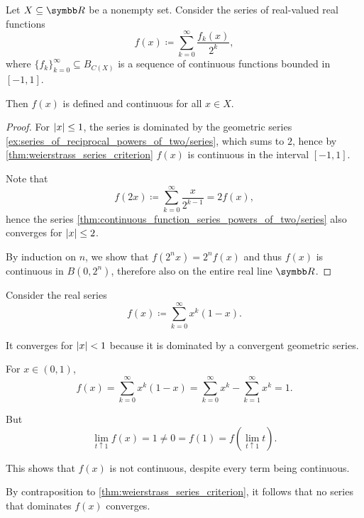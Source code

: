 \begin{corollary}\label{thm:continuous_function_series_powers_of_two}
  Let \( X \subseteq \R \) be a nonempty set. Consider the series of real-valued real functions
  \begin{equation}\label{thm:continuous_function_series_powers_of_two/series}
    f(x) \coloneqq \sum_{k=0}^\infty \frac {f_k(x)} {2^k},
  \end{equation}
  where \( \{ f_k \}_{k=0}^\infty \subseteq B_{C(X)} \) is a sequence of continuous functions bounded in \( [-1, 1] \).

  Then \( f(x) \) is defined and continuous for all \( x \in X \).
\end{corollary}
\begin{proof}
  For \( \left\vert x \right\vert \leq 1 \), the series is dominated by the geometric series \cref{ex:series_of_reciprocal_powers_of_two/series}, which sums to \( 2 \), hence by \cref{thm:weierstrass_series_criterion} \( f(x) \) is continuous in the interval \( [-1, 1] \).

  Note that
  \begin{equation*}
    f(2x) \coloneqq \sum_{k=0}^\infty \frac x {2^{k-1}} = 2 f(x),
  \end{equation*}
  hence the series \cref{thm:continuous_function_series_powers_of_two/series} also converges for \( \left\vert x \right\vert \leq 2 \).

  By induction on \( n \), we show that \( f(2^n x) = 2^n f(x) \) and thus \( f(x) \) is continuous in \( B(0, 2^n) \), therefore also on the entire real line \( \R \).
\end{proof}

\begin{example}\label{thm:weierstrass_series_criterion/counterexample}\cite[]{Фихтенгольц1968/2}
  Consider the real series
  \begin{equation*}
    f(x) \coloneqq \sum_{k=0}^\infty x^k (1 - x).
  \end{equation*}

  It converges for \( \left\vert x \right\vert < 1 \) because it is dominated by a convergent geometric series.

  For \( x \in (0, 1) \),
  \begin{equation*}
    f(x)
    =
    \sum_{k=0}^\infty x^k (1 - x)
    =
    \sum_{k=0}^\infty x^k - \sum_{k=1}^\infty x^k
    =
    1.
  \end{equation*}

  But
  \begin{equation*}
    \lim_{t \uparrow 1} f(x) = 1 \neq 0 = f(1) = f(\lim_{t \uparrow 1} t).
  \end{equation*}

  This shows that \( f(x) \) is not continuous, despite every term being continuous.

  By contraposition to \cref{thm:weierstrass_series_criterion}, it follows that no series that dominates \( f(x) \) converges.
\end{example}

